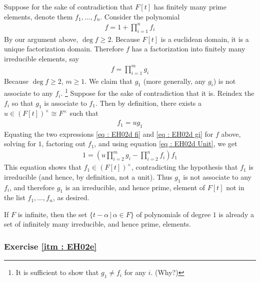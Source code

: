 \documentclass[oneside, english, 11pt]{article}
\newcommand{\isomorphism}{\cong}
\newcommand{\st}{\, | \,}
\begin{document}
Suppose for the sake of contradiction that $F[t]$ has finitely many prime elements, denote them $f_{1}, \ldots, f_{n}$. Consider the polynomial
\begin{align}
f
=
1 + \prod_{i = 1}^{n} f_{i}%
\label{eq : EH02d fi}
\end{align}
By our argument above, $\deg f \geq 2$. Because $F[t]$ is a euclidean domain, it is a unique factorization domain. Therefore $f$ has a factorization into finitely many irreducible elements, say
\begin{align}
f
=
\prod_{i = 1}^{m} g_{i}%
\label{eq : EH02d gi}
\end{align}
Because $\deg f \geq 2$, $m \geq 1$. We claim that $g_{1}$ (more generally, any $g_{i}$) is not associate to any $f_{i}$.%
\footnote{It is sufficient to show that $g_{1} \neq f_{i}$ for any $i$. (Why?)} %
Suppose for the sake of contradiction that it is. Reindex the $f_{i}$ so that $g_{1}$ is associate to $f_{1}$. Then by definition, there exists a $u \in (F[t])^{\times} \isomorphism F^{\times}$ such that
\begin{align}
f_{1} = u g_{1}%
\label{eq : EH02d Unit}
\end{align}
Equating the two expressions \eqref{eq : EH02d fi} and \eqref{eq : EH02d gi} for $f$ above, solving for $1$, factoring out $f_{1}$, and using equation \eqref{eq : EH02d Unit}, we get
\begin{align*}
1
=
\left(u \prod_{i = 2}^{m} g_{i} - \prod_{i = 2}^{n} f_{i}\right) f_{1}
\end{align*}
This equation shows that $f_{1} \in (F[t])^{\times}$, contradicting the hypothesis that $f_{1}$ is irreducible (and hence, by definition, not a unit). Thus $g_{1}$ is not associate to any $f_{i}$, and therefore $g_{1}$ is an irreducible, and hence prime, element of $F[t]$ not in the list $f_{1}, \ldots, f_{n}$, as desired.

If $F$ is infinite, then the set $\{t - \alpha \st \alpha \in F\}$ of polynomials of degree $1$ is already a set of infinitely many irreducible, and hence prime, elements.



\subsubsection*{Exercise \ref{itm : EH02e}}
\end{document}
